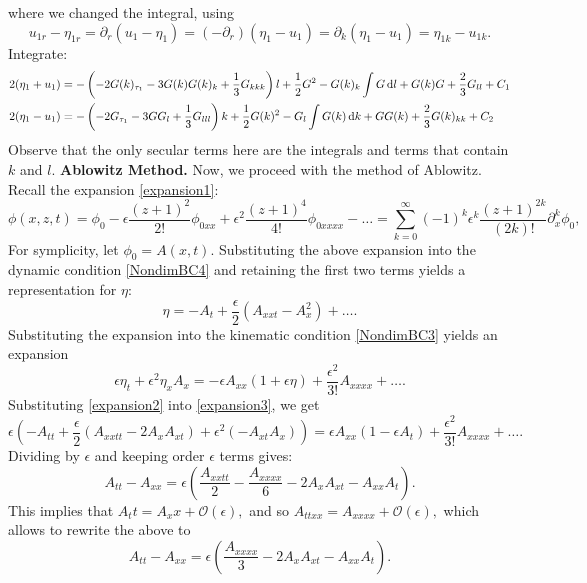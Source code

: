 \documentclass[10pt,reqno,oneside,a4paper]{article}
\begin{document}
where we changed the integral, using
\[ 
u_{1r} - \eta_{1r} = \partial_r (u_1 - \eta_1) = (-\partial_r)(\eta_1 - u_1) = \partial_k(\eta_1 - u_1) = \eta_{1k} - u_{1k}.
\]
Integrate:
\begin{align*}
2(\eta_{1} + u_{1}) &= -\left(-2G(k)_{\tau_1} - 3 G(k)G(k)_k + \frac{1}{3}G_{kkk}\right)l + \frac{1}{2}G^2  - G(k)_k \int G \,\mathrm{d} l + G(k)G + \frac{2}{3} G_{ll} + C_1 \\
2(\eta_{1} - u_{1}) &=  - \left(-2G_{\tau_1} - 3GG_l + \frac{1}{3}G_{lll}\right)k + \frac{1}{2}G(k)^2 - G_l \int G(k) \,\mathrm{d} k +GG(k) + \frac{2}{3}G(k)_{kk} + C_2 
\end{align*}
Observe that the only secular terms here are the integrals and terms that contain $k$ and $l.$
\vspace{1cm}
\newline \textbf{Ablowitz Method.} Now, we proceed with the method of Ablowitz. Recall the expansion \eqref{expansion1}:
\[
\phi(x,z,t) = \phi_0 - \epsilon\frac{(z+1)^2}{2!}\phi_{0xx} + \epsilon^2 \frac{(z+1)^4}{4!}\phi_{0xxxx} - \ldots = \sum^{\infty}_{k=0} (-1)^k \epsilon^k \frac{(z+1)^{2k}}{(2k)!} \partial^k_x \phi_0,
\]
For symplicity, let $\phi_0 = A(x,t).$ Substituting the above expansion into the dynamic condition \eqref{NondimBC4} and retaining the first two terms yields a representation for $\eta:$
\begin{equation}\label{expansion2}
\eta = -A_t + \frac{\epsilon}{2}(A_{xxt} - A_x^2) + \ldots .
\end{equation}
Substituting the expansion into the kinematic condition \eqref{NondimBC3} yields an expansion
\begin{equation}\label{expansion3}
\epsilon \eta_t + \epsilon^2 \eta_x A_x = -\epsilon A_{xx}(1+ \epsilon \eta) + \frac{\epsilon^2}{3!}A_{xxxx} + \ldots .
\end{equation}
Substituting \eqref{expansion2} into \eqref{expansion3}, we get 
\begin{equation}\label{well-posed}
\epsilon(-A_{tt} + \frac{\epsilon}{2}(A_{xxtt} - 2A_xA_{xt})+\epsilon^2(-A_{xt}A_x)) = \epsilon A_{xx}(1- \epsilon A_t) + \frac{\epsilon^2}{3!}A_{xxxx} + \ldots.
\end{equation}
Dividing by $\epsilon$ and keeping order $\epsilon$ terms gives:
\[ 
A_{tt} - A_{xx} = \epsilon\left(\frac{A_{xxtt}}{2} - \frac{A_{xxxx}}{6} - 2A_xA_{xt} - A_{xx}A_{t}\right).
\]
This implies that $A_tt = A_xx + \mathcal{O}(\epsilon),$ and so $A_{ttxx} = A_{xxxx} + \mathcal{O}(\epsilon),$ which allows to rewrite the above to
\begin{equation}\label{ill-posed}
A_{tt} - A_{xx} = \epsilon\left(\frac{A_{xxxx}}{3} - 2A_xA_{xt} - A_{xx}A_{t}\right).
\end{equation}
\end{document}
